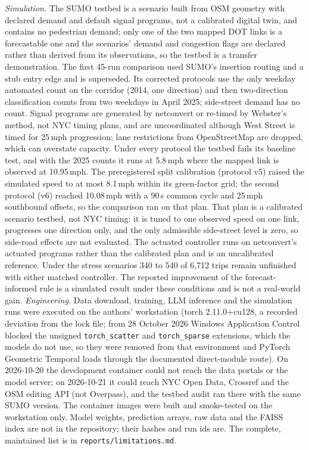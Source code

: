 \textit{Simulation.} The SUMO testbed is a scenario built from OSM geometry with declared demand and default signal
programs, not a calibrated digital twin, and contains no pedestrian demand; only one of the two mapped DOT links is a
forecastable one and the scenarios' demand and congestion flags are declared rather than derived from its
observations, so the testbed is a transfer demonstration. The first 45-run comparison used SUMO's insertion
routing and a stub entry edge and is superseded. Its corrected protocols use the only weekday automated count on the
corridor (2014, one direction) and then two-direction classification counts from two weekdays in April 2025; side-street
demand has no count. Signal programs are generated by netconvert or re-timed by Webster's method, not NYC timing plans,
and are uncoordinated although West Street is timed for 25\,mph progression; lane restrictions from OpenStreetMap are
dropped, which can overstate capacity. Under every protocol the testbed fails its baseline test, and with the 2025
counts it runs at 5.8\,mph where the mapped link is observed at 10.95\,mph. The preregistered split calibration (protocol v5)
raised the simulated speed to at most 8.1\,mph within its green-factor grid; the second protocol (v6) reached 10.08\,mph
with a 90\,s common cycle and 25\,mph southbound offsets, so the comparison ran on that plan. That plan is a calibrated
scenario testbed, not NYC timing: it is tuned to one observed speed on one link, progresses one direction only, and the
only admissible side-street level is zero, so side-road effects are not evaluated. The actuated controller runs on
netconvert's actuated programs rather than the calibrated plan and is an uncalibrated reference. Under the stress
scenarios 340 to 540 of 6{,}712 trips remain unfinished with either matched controller. The reported improvement of the
forecast-informed rule is a simulated result under these conditions and is not a real-world gain.
\textit{Engineering.} Data download, training, LLM inference and the simulation runs were executed on the
authors' workstation (torch 2.11.0+cu128, a recorded deviation from the lock file; from 28 October 2026 Windows
Application Control blocked the unsigned \texttt{torch\_scatter} and \texttt{torch\_sparse} extensions, which the
models do not use, so they were removed from that environment and PyTorch Geometric Temporal loads through the
documented direct-module route). On 2026-10-20 the development
container could not reach the data portals or the model server; on 2026-10-21 it could reach NYC Open Data, Crossref
and the OSM editing API (not Overpass), and the testbed audit ran there with the same SUMO version. The container
images were built and smoke-tested on the workstation only. Model weights, prediction arrays, raw data and the FAISS
index are not in the repository; their hashes and run ids are. The complete, maintained list is in
\texttt{reports/limitations.md}.
